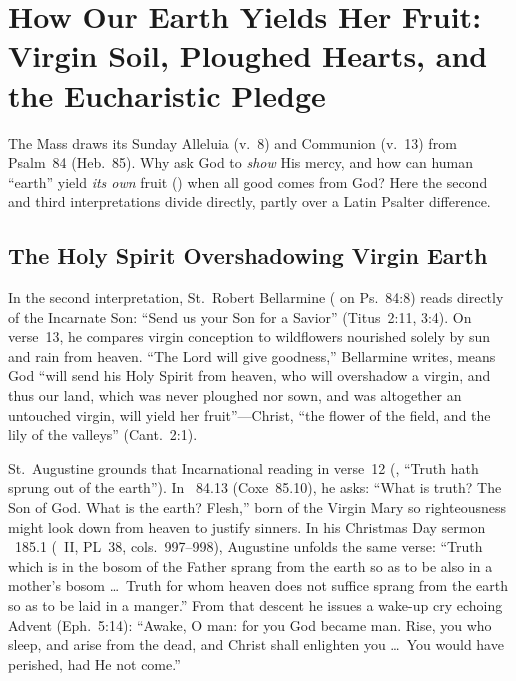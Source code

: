 \section{How Our Earth Yields Her Fruit: Virgin Soil, Ploughed Hearts, and the Eucharistic Pledge}

The Mass draws its Sunday Alleluia (v.~8) and Communion (v.~13) from Psalm~84 (Heb.~85). Why ask God to \emph{show} His mercy, and how can human ``earth'' yield \emph{its own} fruit () when all good comes from God? Here the second and third interpretations divide directly, partly over a Latin Psalter difference.

\subsection{The Holy Spirit Overshadowing Virgin Earth}

In the second interpretation, St.~Robert Bellarmine ( on Ps.~84:8) reads  directly of the Incarnate Son: ``Send us your Son for a Savior'' (Titus~2:11, 3:4). On verse~13, he compares virgin conception to wildflowers nourished solely by sun and rain from heaven. ``The Lord will give goodness,'' Bellarmine writes, means God ``will send his Holy Spirit from heaven, who will overshadow a virgin, and thus our land, which was never ploughed nor sown, and was altogether an untouched virgin, will yield her fruit''---Christ, ``the flower of the field, and the lily of the valleys'' (Cant.~2:1).

St.~Augustine grounds that Incarnational reading in verse~12 (, ``Truth hath sprung out of the earth''). In ~84.13 (Coxe~85.10), he asks: ``What is truth? The Son of God. What is the earth? Flesh,'' born of the Virgin Mary so righteousness might look down from heaven to justify sinners. In his Christmas Day sermon ~185.1 (~II, PL~38, cols.~997--998), Augustine unfolds the same verse: ``Truth which is in the bosom of the Father sprang from the earth so as to be also in a mother's bosom \dots\ Truth for whom heaven does not suffice sprang from the earth so as to be laid in a manger.'' From that descent he issues a wake-up cry echoing Advent (Eph.~5:14): ``Awake, O man: for you God became man. Rise, you who sleep, and arise from the dead, and Christ shall enlighten you \dots\ You would have perished, had He not come.''


